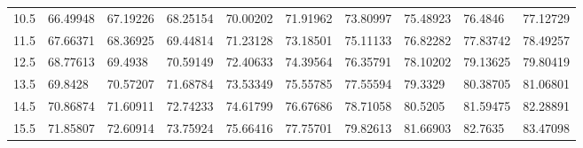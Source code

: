 \documentclass[10pt,twocolumn,letterpaper]{article}
\begin{document}
\begin{table}
{\begin{tabular}{llllllllll}
    10.5            & 66.49948                               & 67.19226                               & 68.25154                                & 70.00202                                & 71.91962                                & 73.80997                                & 75.48923                                & 76.4846                                 & 77.12729                                \\
    11.5            & 67.66371                               & 68.36925                               & 69.44814                                & 71.23128                                & 73.18501                                & 75.11133                                & 76.82282                                & 77.83742                                & 78.49257                                \\
    12.5            & 68.77613                               & 69.4938                                & 70.59149                                & 72.40633                                & 74.39564                                & 76.35791                                & 78.10202                                & 79.13625                                & 79.80419                                \\
    13.5            & 69.8428                                & 70.57207                               & 71.68784                                & 73.53349                                & 75.55785                                & 77.55594                                & 79.3329                                 & 80.38705                                & 81.06801                                \\
    14.5            & 70.86874                               & 71.60911                               & 72.74233                                & 74.61799                                & 76.67686                                & 78.71058                                & 80.5205                                 & 81.59475                                & 82.28891                                \\
    15.5            & 71.85807                               & 72.60914                               & 73.75924                                & 75.66416                                & 77.75701                                & 79.82613                                & 81.66903                                & 82.7635                                 & 83.47098                                \\

\end{tabular}}
\end{table}
\end{document}

